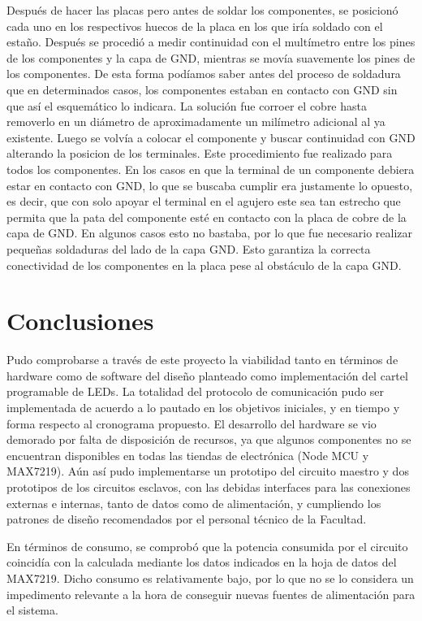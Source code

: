Después de hacer las placas pero antes de soldar los componentes, se posicionó cada uno en los respectivos huecos de la placa en los que iría soldado con el estaño. Después se procedió a medir continuidad con el multímetro entre los pines de los componentes y la capa de GND, mientras se movía suavemente los pines de los componentes. De esta forma podíamos saber antes del proceso de soldadura que en determinados casos, los componentes estaban en contacto con GND sin que así el esquemático lo indicara. La solución fue corroer el cobre hasta removerlo en un diámetro de aproximadamente un milímetro adicional al ya existente. Luego se volvía a colocar el componente y buscar continuidad con GND alterando la posicion de los terminales. Este procedimiento fue realizado para todos los componentes. En los casos en que la terminal de un componente debiera estar en contacto con GND, lo que se buscaba cumplir era justamente lo opuesto, es decir, que con solo apoyar el terminal en el agujero este sea tan estrecho que permita que la pata del componente esté en contacto con la placa de cobre de la capa de GND. En algunos casos esto no bastaba, por lo que fue necesario realizar pequeñas soldaduras del lado de la capa GND. Esto garantiza la correcta conectividad de los componentes en la placa pese al obstáculo de la capa GND.

\section{Conclusiones}

Pudo comprobarse a través de este proyecto la viabilidad tanto en términos de hardware como de software del diseño planteado como implementación del cartel programable de LEDs. 
La totalidad del protocolo de comunicación pudo ser implementada de acuerdo a lo pautado en los objetivos iniciales, y en tiempo y forma respecto al cronograma propuesto. El desarrollo del hardware se vio demorado por falta de disposición de recursos, ya que algunos componentes no se encuentran disponibles en todas las tiendas de electrónica (Node MCU y MAX7219). Aún así pudo implementarse un prototipo del circuito maestro y dos prototipos de los circuitos esclavos, con las debidas interfaces para las conexiones externas e internas, tanto de datos como de alimentación, y cumpliendo los patrones de diseño recomendados por el personal técnico de la Facultad.

En términos de consumo, se comprobó que la potencia consumida por el circuito coincidía con la calculada mediante los datos indicados en la hoja de datos del MAX7219. Dicho consumo es relativamente bajo, por lo que no se lo considera un impedimento relevante a la hora de conseguir nuevas fuentes de alimentación para el sistema. 

